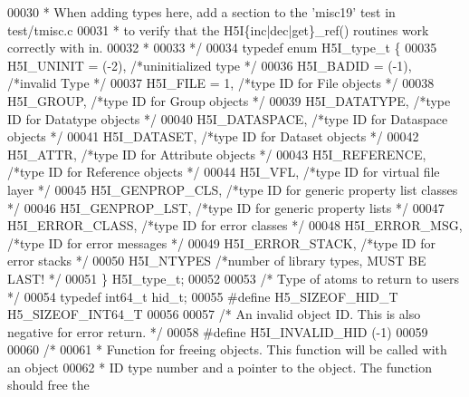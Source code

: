 \begin{DoxyCode}
00030 \textcolor{comment}{ * When adding types here, add a section to the 'misc19' test in test/tmisc.c}
00031 \textcolor{comment}{ * to verify that the H5I\{inc|dec|get\}\_ref() routines work correctly with in.}
00032 \textcolor{comment}{ *}
00033 \textcolor{comment}{ */}
00034 \textcolor{keyword}{typedef} \textcolor{keyword}{enum} H5I\_type\_t \{
00035     H5I\_UNINIT      = (-2), \textcolor{comment}{/*uninitialized type                */}
00036     H5I\_BADID       = (-1), \textcolor{comment}{/*invalid Type                  */}
00037     H5I\_FILE            = 1,    \textcolor{comment}{/*type ID for File objects              */}
00038     H5I\_GROUP,                  \textcolor{comment}{/*type ID for Group objects             */}
00039     H5I\_DATATYPE,           \textcolor{comment}{/*type ID for Datatype objects          */}
00040     H5I\_DATASPACE,          \textcolor{comment}{/*type ID for Dataspace objects         */}
00041     H5I\_DATASET,            \textcolor{comment}{/*type ID for Dataset objects           */}
00042     H5I\_ATTR,               \textcolor{comment}{/*type ID for Attribute objects         */}
00043     H5I\_REFERENCE,          \textcolor{comment}{/*type ID for Reference objects         */}
00044     H5I\_VFL,            \textcolor{comment}{/*type ID for virtual file layer        */}
00045     H5I\_GENPROP\_CLS,            \textcolor{comment}{/*type ID for generic property list classes */}
00046     H5I\_GENPROP\_LST,            \textcolor{comment}{/*type ID for generic property lists        */}
00047     H5I\_ERROR\_CLASS,            \textcolor{comment}{/*type ID for error classes         */}
00048     H5I\_ERROR\_MSG,              \textcolor{comment}{/*type ID for error messages            */}
00049     H5I\_ERROR\_STACK,            \textcolor{comment}{/*type ID for error stacks          */}
00050     H5I\_NTYPES              \textcolor{comment}{/*number of library types, MUST BE LAST!    */}
00051 \} H5I\_type\_t;
00052 
00053 \textcolor{comment}{/* Type of atoms to return to users */}
00054 \textcolor{keyword}{typedef} int64\_t hid\_t;
00055 \textcolor{preprocessor}{#define H5\_SIZEOF\_HID\_T         H5\_SIZEOF\_INT64\_T}
00056 
00057 \textcolor{comment}{/* An invalid object ID. This is also negative for error return. */}
00058 \textcolor{preprocessor}{#define H5I\_INVALID\_HID         (-1)}
00059 
00060 \textcolor{comment}{/*}
00061 \textcolor{comment}{ * Function for freeing objects. This function will be called with an object}
00062 \textcolor{comment}{ * ID type number and a pointer to the object. The function should free the}

\end{DoxyCode}

